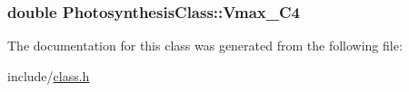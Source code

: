 \subsubsection[{\texorpdfstring{Vmax\+\_\+\+C4}{Vmax_C4}}]{\setlength{\rightskip}{0pt plus 5cm}double Photosynthesis\+Class\+::\+Vmax\+\_\+\+C4}\hypertarget{class_photosynthesis_class_a2bbe02243ae126dc85e70263847a51e8}{}\label{class_photosynthesis_class_a2bbe02243ae126dc85e70263847a51e8}


The documentation for this class was generated from the following file\+:\begin{DoxyCompactItemize}
\item 
include/\hyperlink{class_8h}{class.\+h}\end{DoxyCompactItemize}

